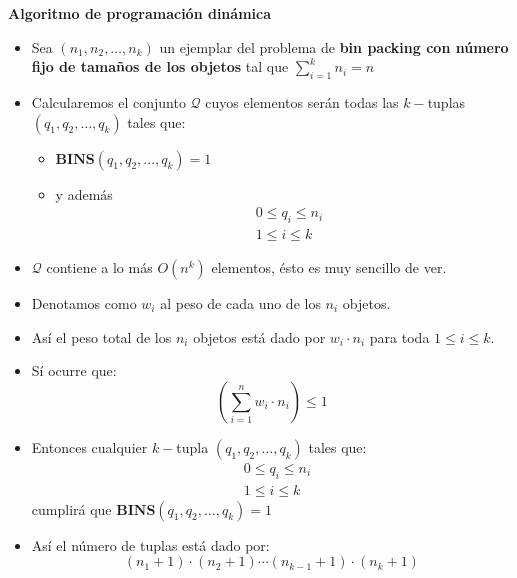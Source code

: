 \begin{frame}{\subsectiontitle}
    \textbf{Algoritmo de programación dinámica}
    \begin{itemize}
        \item Sea \(\left(n_{1}, n_{2}, \dotsc, n_{k}\right)\) un ejemplar del problema de \textbf{bin packing con número fijo de tamaños de los objetos} tal que 
        \(\displaystyle\sum_{i=1}^{k}n_{i} = n\)
        \item Calcularemos el conjunto \(\mathcal{Q}\) cuyos elementos serán todas las \(k-\)tuplas 
        \(\left(q_{1}, q_{2}, \dotsc, q_{k}\right)\) tales que:
        \begin{itemize}
            \item \(\mathbf{BINS}\left(q_{1}, q_{2}, \dotsc, q_{k}\right) = 1\)
            \item y además
                    \begin{align*}
                        &0 \leq q_{i} \leq n_{i} \\
                        &1 \leq i \leq k
                    \end{align*}
        \end{itemize}
    \end{itemize}
\end{frame}

\begin{frame}{\subsectiontitle}
    \begin{itemize}
        \item \(\mathcal{Q}\) contiene a lo más \(O\left(n^k\right)\) elementos, ésto es muy sencillo de ver.
        \item Denotamos como \(w_{i}\) al peso de cada uno de los \(n_{i}\) objetos.
        \item Así el peso total de los \(n_{i}\) objetos está dado por \(w_{i} \cdot n_{i}\) para toda \(1 \leq i \leq k\).
        \item Sí ocurre que:
        \[
            \left(\sum_{i = 1}^{n}  w_{i} \cdot n_{i}\right) \leq 1
        \]
        \item Entonces cualquier \(k-\)tupla \(\left(q_{1}, q_{2}, \dotsc, q_{k}\right)\) tales que:
        \begin{align*}
            &0 \leq q_{i} \leq n_{i} \\
            &1 \leq i \leq k
        \end{align*}
        cumplirá que \(\mathbf{BINS}\left(q_{1}, q_{2}, \dotsc, q_{k}\right) = 1\) 
        \item Así el número de tuplas está dado por:
        \[
            (n_{1} + 1) \cdot (n_{2} + 1) \dotsm  (n_{k-1} + 1) \cdot (n_{k} + 1)
        \]
    \end{itemize}
\end{frame}

